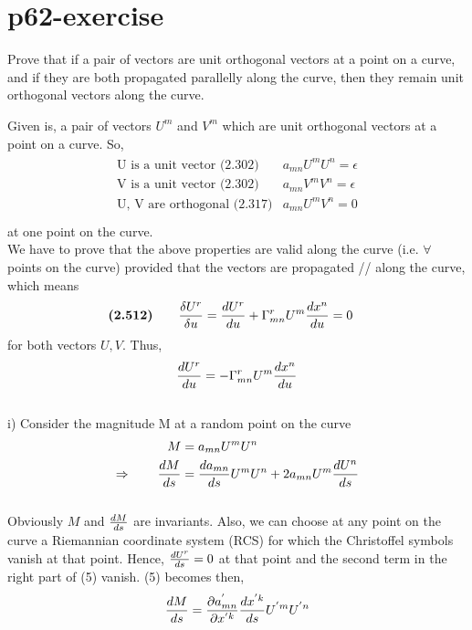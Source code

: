 \section{p62-exercise}
\begin{tcolorbox}
Prove that if a pair of vectors are unit orthogonal vectors at a point on a curve, and if they are both propagated parallelly along the curve, then they remain unit orthogonal vectors along the curve.
\end{tcolorbox}
Given is, a pair of vectors $U^m$ and $V^m$ which are unit orthogonal vectors at a point on a curve. So,
\begin{align}
\begin{array}{cc}
\text{U is a unit vector (2.302)}& a_{mn}U^m U^n = \epsilon\\
\text{V is a unit vector (2.302)}& a_{mn}V^m V^n = \epsilon\\
\text{U, V are orthogonal (2.317)}& a_{mn}U^m V^n = 0\\
\end{array}
\end{align}
at one point on the curve.\\
We have to prove that the above properties are valid along the curve (i.e. $\forall$ points on the curve) provided that the vectors are propagated // along the curve, which means
\begin{align}
\textbf{(2.512)}\quad\quad \frac{\delta U^r}{\delta u} &= \dv{U^r}{u} + \Gamma^r_{mn}U^m \dv{x^n}{u} = 0
\end{align}
for both vectors $U, V$. Thus,
\begin{align}
\dv{U^r}{u} = - \Gamma^r_{mn}U^m \dv{x^n}{u}
\end{align}\\
i) Consider the magnitude M at a random point on the curve
\begin{align}
\ M &= a_{mn}U^m U^n \\
\Rightarrow \quad\quad \dv{M}{s} &= \dv{a_{mn}}{s}U^m U^n + 2a_{mn}U^m \dv{U^n}{s} 
\end{align}\\
Obviously $M$ and $\dv{M}{s}$ are invariants. Also, we can choose at any point on the curve a Riemannian coordinate system (RCS) for which the Christoffel symbols vanish at that point. Hence, $\dv{U^r}{s} = 0 $ at that point and the second term in the right part of (5) vanish. (5) becomes then,
\begin{align}
 \dv{M}{s} = \pdv{a^{'}_{mn}}{x^{'k}}\dv{x^{'k}}{s}U^{'m} U^{'n}  
\end{align}
